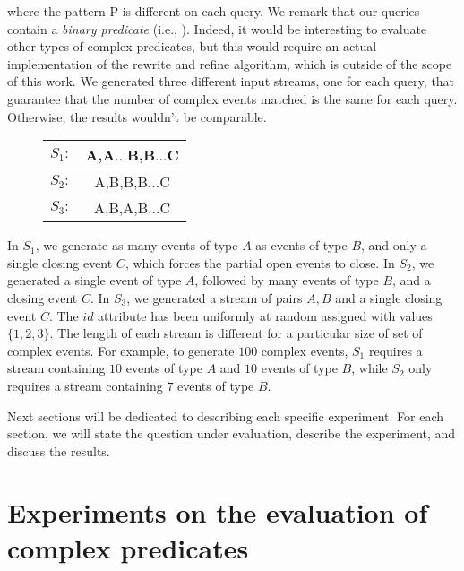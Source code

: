 where the pattern \textrm{P} is different on each query. We remark that our queries contain a \emph{binary predicate} (i.e., ). Indeed, it would be interesting to evaluate other types of complex predicates, but this would require an actual implementation of the rewrite and refine algorithm, which is outside of the scope of this work. We generated three different input streams, one for each query, that guarantee that the number of complex events matched is the same for each query. Otherwise, the results wouldn't be comparable.

\begin{figure}[H]
  \centering
  \begin{tabular}{l c}
    \hline
    $S_{1}:$ & A,A$\ldots$B,B$\ldots$C\\
    \hline
    $S_{2}:$ & A,B,B,B$\ldots$C\\
    \hline
    $S_{3}:$ & A,B,A,B$\ldots$C\\
    \hline
  \end{tabular}
\end{figure}

In $S_{1}$, we generate as many events of type $A$ as events of type $B$, and only a single closing event $C$, which forces the partial open events to close. In $S_{2}$, we generated a single event of type $A$, followed by many events of type $B$, and a closing event $C$. In $S_{3}$, we generated a stream of pairs $A, B$ and a single closing event $C$. The $id$ attribute has been uniformly at random assigned with values $\{1, 2, 3\}$. The length of each stream is different for a particular size of set of complex events. For example, to generate $100$ complex events, $S_{1}$ requires a stream containing $10$ events of type $A$ and $10$ events of type $B$, while $S_{2}$ only requires a stream containing $7$ events of type $B$.

Next sections will be dedicated to describing each specific experiment. For each section, we will state the question under evaluation, describe the experiment, and discuss the results.

\section{Experiments on the evaluation of complex predicates}\label{sec:predicates}


